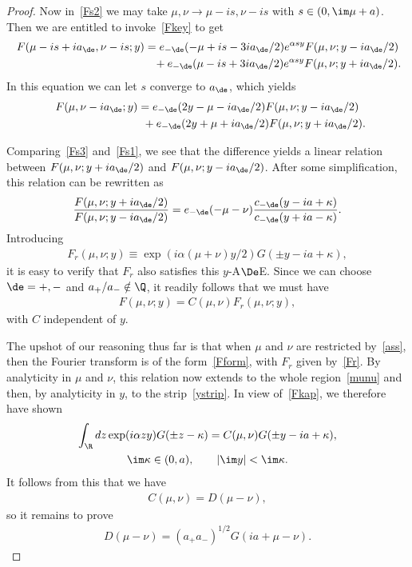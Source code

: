 \begin{proof}
Now in~\eqref{Fs2} we may take $\mu,\nu\to \mu-is,\nu-is$ with $s\in(0,\im\mu +a)$. Then we are entitled to invoke~\eqref{Fkey} to get
\begin{gather}
F(\mu-is+ia_{\de},\nu-is;y)     =     e_{-\de}(-\mu+is-3ia_{\de}/2)e^{\alpha sy}F(\mu,\nu;y-ia_{\de}/2)
\nonumber \\
\phantom{F(\mu-is+ia_{\de},\nu-is;y)     =}{}   +e_{-\de}(\mu-is+3ia_{\de}/2)e^{\alpha sy}F(\mu,\nu;y+ia_{\de}/2).
\end{gather}
In this equation we can let $s$ converge to $a_{\de}$, which yields
\begin{gather}
F(\mu,\nu-ia_{\de};y)     =     e_{-\de}(2y-\mu-ia_{\de}/2)F(\mu,\nu;y-ia_{\de}/2)
\nonumber \\
\phantom{F(\mu,\nu-ia_{\de};y)     =}{}  +e_{-\de}(2y+\mu+ia_{\de}/2)F(\mu,\nu;y+ia_{\de}/2).\label{Fs3}
\end{gather}

Comparing~\eqref{Fs3} and~\eqref{Fs1}, we see that the dif\/ference yields a linear relation between $F(\mu,\nu;y+ia_{\de}/2)$ and $F(\mu,\nu;y-ia_{\de}/2)$. After some simplif\/ication, this relation can be rewritten as
\begin{gather}\label{Fade}
\frac{F(\mu,\nu;y+ia_{\de}/2)}{F(\mu,\nu;y-ia_{\de}/2)}=e_{-\de}(-\mu-\nu)\frac{c_{-\de}(y-ia+\kappa)}{c_{-\de}(y+ia-\kappa)}.
\end{gather}
Introducing
\begin{gather}\label{Fr}
F_r(\mu,\nu;y)\equiv \exp(i\alpha (\mu+\nu)y/2)G(\pm y-ia+\kappa),
\end{gather}
it is easy to verify that $F_r$ also satisf\/ies this $y$-A$\De$E. Since we can choose $\de=+,-$ and $a_{+}/a_{-}\notin\Q$, it readily follows that we must have
\begin{gather}\label{Fform}
F(\mu,\nu;y)=C(\mu,\nu)F_r(\mu,\nu;y),
\end{gather}
with $C$ independent of $y$.

The upshot of our reasoning thus far is that when $\mu$ and $\nu$ are restricted by~\eqref{ass}, then the Fourier transform is of the form~\eqref{Fform}, with $F_r$ given by~\eqref{Fr}. By analyticity in $\mu$ and $\nu$, this relation now extends to the whole region~\eqref{munu} and then, by analyticity in $y$, to the strip~\eqref{ystrip}. In view of~\eqref{Fkap}, we therefore have shown
\begin{gather}
\int_{\R}dz\exp(i\alpha zy)G(\pm z-\kappa)=C(\mu,\nu)G(\pm y-ia+\kappa),\\
 \im \kappa \in (0,a),\qquad |\im y|<\im \kappa.\nonumber
\end{gather}
It follows from this that we have
\begin{gather}
C(\mu,\nu)=D(\mu-\nu),
\end{gather}
so it remains to prove
\begin{gather}
D(\mu-\nu)=(a_{+}a_{-})^{1/2} G(ia+\mu-\nu).
\end{gather}


\end{proof}
